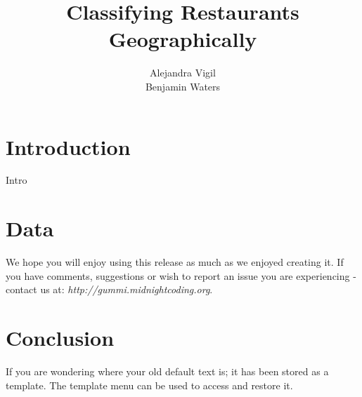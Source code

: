 \documentclass[11pt]{article}
\title{\textbf{Classifying Restaurants Geographically}}
\author{Alejandra Vigil\\
		Benjamin Waters}
\date{}
\begin{document}
\maketitle

\section{Introduction}

Intro

\section{Data}
We hope you will enjoy using this release as much as we enjoyed creating it. If you have comments, suggestions or wish to report an issue you are experiencing - contact us at: \emph{http://gummi.midnightcoding.org}.

\section{Conclusion}
If you are wondering where your old default text is; it has been stored as a template. The template menu can be used to access and restore it. 
\end{document}
